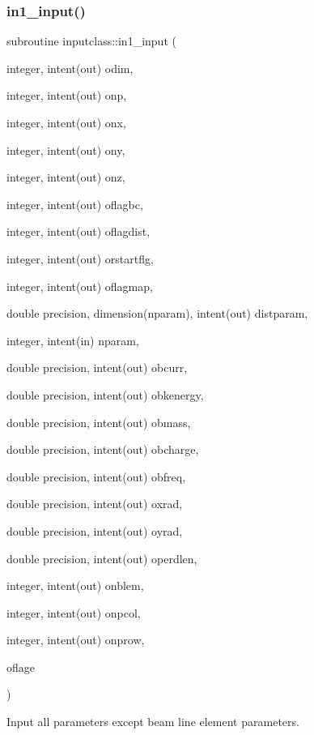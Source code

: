\subsubsection{\texorpdfstring{in1\_input()}{in1\_input()}}
{\footnotesize\ttfamily subroutine inputclass\+::in1\+\_\+input (\begin{DoxyParamCaption}\item[{integer, intent(out)}]{odim,  }\item[{integer, intent(out)}]{onp,  }\item[{integer, intent(out)}]{onx,  }\item[{integer, intent(out)}]{ony,  }\item[{integer, intent(out)}]{onz,  }\item[{integer, intent(out)}]{oflagbc,  }\item[{integer, intent(out)}]{oflagdist,  }\item[{integer, intent(out)}]{orstartflg,  }\item[{integer, intent(out)}]{oflagmap,  }\item[{double precision, dimension(nparam), intent(out)}]{distparam,  }\item[{integer, intent(in)}]{nparam,  }\item[{double precision, intent(out)}]{obcurr,  }\item[{double precision, intent(out)}]{obkenergy,  }\item[{double precision, intent(out)}]{obmass,  }\item[{double precision, intent(out)}]{obcharge,  }\item[{double precision, intent(out)}]{obfreq,  }\item[{double precision, intent(out)}]{oxrad,  }\item[{double precision, intent(out)}]{oyrad,  }\item[{double precision, intent(out)}]{operdlen,  }\item[{integer, intent(out)}]{onblem,  }\item[{integer, intent(out)}]{onpcol,  }\item[{integer, intent(out)}]{onprow,  }\item[{}]{oflage }\end{DoxyParamCaption})}



Input all parameters except beam line element parameters. 

